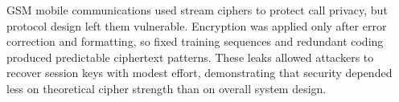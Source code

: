 GSM mobile communications used stream ciphers to protect call privacy, but protocol design left them vulnerable. Encryption was applied only after error correction and formatting, so fixed training sequences and redundant coding produced predictable ciphertext patterns. These leaks allowed attackers to recover session keys with modest effort, demonstrating that security depended less on theoretical cipher strength than on overall system design.